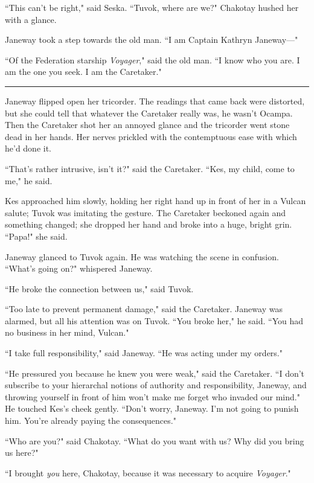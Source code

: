 \documentclass[twoside,letterpaper,12pt]{memoir}
\begin{document}
``This can't be right," said Seska. ``Tuvok, where are we?" Chakotay hushed her with a glance. 

Janeway took a step towards the old man. ``I am Captain Kathryn Janeway---" 

``Of the Federation starship \textit{Voyager}," said the old man. ``I know who you are. I am the one you seek. I am the Caretaker." 

\begin{center}\rule{3cm}{0.4 pt}\end{center} 

Janeway flipped open her tricorder. The readings that came back were distorted, but she could tell that whatever the Caretaker really was, he wasn't Ocampa. Then the Caretaker shot her an annoyed glance and the tricorder went stone dead in her hands. Her nerves prickled with the contemptuous ease with which he'd done it. 

``That's rather intrusive, isn't it?" said the Caretaker. ``Kes, my child, come to me," he said. 

Kes approached him slowly, holding her right hand up in front of her in a Vulcan salute; Tuvok was imitating the gesture. The Caretaker beckoned again and something changed; she dropped her hand and broke into a huge, bright grin. ``Papa!" she said. 

Janeway glanced to Tuvok again. He was watching the scene in confusion. ``What's going on?" whispered Janeway. 

``He broke the connection between us," said Tuvok. 

``Too late to prevent permanent damage," said the Caretaker. Janeway was alarmed, but all his attention was on Tuvok. ``You broke her," he said. ``You had no business in her mind, Vulcan." 

``I take full responsibility," said Janeway. ``He was acting under my orders." 

``He pressured you because he knew you were weak," said the Caretaker. ``I don't subscribe to your hierarchal notions of authority and responsibility, Janeway, and throwing yourself in front of him won't make me forget who invaded our mind." He touched Kes's cheek gently. ``Don't worry, Janeway. I'm not going to punish him. You're already paying the consequences." 

``Who are you?" said Chakotay. ``What do you want with us? Why did you bring us here?" 

``I brought \textit{you} here, Chakotay, because it was necessary to acquire \textit{Voyager}." 
\end{document}
